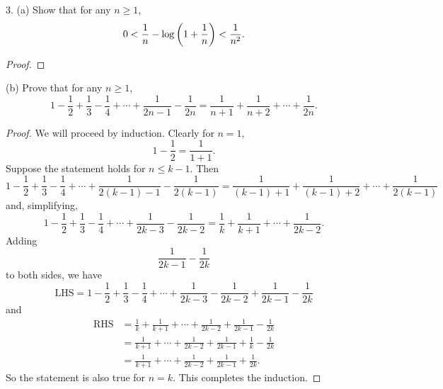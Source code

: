 \documentclass{article}
\begin{document}
\newpage

3. (a) Show that for any $n \geq 1$,
%
\begin{equation}
    0 < \frac{1}{n} - \log \del{1 + \frac{1}{n}} < \frac{1}{n^2}.
    \label{eq:q3-a}
\end{equation}

\begin{proof}

\end{proof}

(b) Prove that for any $n \geq 1$,
%
\begin{equation}
    1 - \frac{1}{2} + \frac{1}{3} - \frac{1}{4} + \cdots + \frac{1}{2 n - 1} - \frac{1}{2 n}
    = \frac{1}{n + 1} + \frac{1}{n + 2} + \cdots + \frac{1}{2 n}.
    \label{eq:q3-b}
\end{equation}

\begin{proof}

We will proceed by induction. Clearly for $n = 1$,
%
\begin{equation*}
    1 - \frac{1}{2} = \frac{1}{1 + 1}
    .
\end{equation*}
%
Suppose the statement holds for $n \leq k - 1$. Then
%
\begin{equation*}
    1 - \frac{1}{2} + \frac{1}{3} - \frac{1}{4} + \cdots + \frac{1}{2 (k - 1) - 1} - \frac{1}{2 (k - 1)}
    = \frac{1}{(k - 1) + 1} + \frac{1}{(k - 1) + 2} + \cdots + \frac{1}{2 (k - 1)}
\end{equation*}
%
and, simplifying,
%
\begin{equation*}
    1 - \frac{1}{2} + \frac{1}{3} - \frac{1}{4} + \cdots + \frac{1}{2 k - 3} - \frac{1}{2 k - 2}
    = \frac{1}{k} + \frac{1}{k + 1} + \cdots + \frac{1}{2 k - 2}
    .
\end{equation*}
%
Adding
%
\begin{equation*}
    \frac{1}{2 k - 1} - \frac{1}{2 k}
\end{equation*}
%
to both sides, we have
%
\begin{equation*}
    \text{LHS}
        = 1 - \frac{1}{2} + \frac{1}{3} - \frac{1}{4} + \cdots + \frac{1}{2 k - 3} - \frac{1}{2 k - 2}
            + \frac{1}{2 k - 1} - \frac{1}{2 k}
\end{equation*}
%
and
%
\begin{align*}
    \text{RHS}
        &= \frac{1}{k} + \frac{1}{k + 1} + \cdots + \frac{1}{2 k - 2} + \frac{1}{2 k - 1} - \frac{1}{2 k} \\
        &= \frac{1}{k + 1} + \cdots + \frac{1}{2 k - 2} + \frac{1}{2 k - 1} + \frac{1}{k} - \frac{1}{2 k} \\
        &= \frac{1}{k + 1} + \cdots + \frac{1}{2 k - 2} + \frac{1}{2 k - 1} + \frac{1}{2 k}
        .
\end{align*}
%
So the statement is also true for $n = k$. This completes the induction.

\end{proof}
\end{document}
